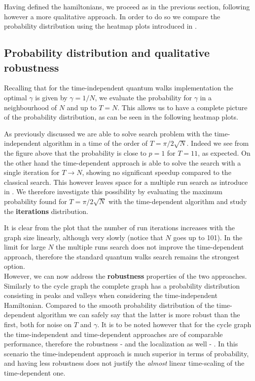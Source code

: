     \noindent
    Having defined the hamiltonians, we proceed as in the previous section, following however a more qualitative approach. In order to do so we compare the probability distribution using the heatmap plots introduced in .


    \subsection{Probability distribution and qualitative robustness}
    Recalling that for the time-independent quantum walks implementation the optimal $\gamma$ is given by $\gamma=1/N$, we evaluate the probability for $\gamma$ in a neighbourhood of $N$ and up to $T=N$. This allows us to have a complete picture of the probability distribution, as can be seen in the following heatmap plots.

    
    As previously discussed we are able to solve search problem with the time-independent algorithm in a time of the order of $T=\pi/2\sqrt{N}$. Indeed we see from the figure above that the probability is close to $p=1$ for $T=11$, as expected. On the other hand the time-dependent approach is able to solve the search with a single iteration for $T\rightarrow N$, showing no significant speedup compared to the classical search. This however leaves space for a multiple run search as introduce in . We therefore investigate this possibility by evaluating the maximum probability found for $T=\pi/2\sqrt{N}$ with the time-dependent algorithm and study the \textbf{iterations} distribution.

    

    It is clear from the plot that the number of run iterations increases with the graph size linearly, although very slowly (notice that $N$ goes up to 101). In the limit for large $N$ the multiple runs search does not improve the time-dependent approach, therefore the standard quantum walks search remains the strongest option.
    \\


    \noindent
    However, we can now address the \textbf{robustness} properties of the two approaches. Similarly to the cycle graph the complete graph has a probability distribution consisting in peaks and valleys when considering the time-independent Hamiltonian. Compared to the smooth probability distribution of the time-dependent algorithm we can safely say that the latter is more robust than the first, both for noise on $T$ and $\gamma$. It is to be noted however that for the cycle graph the time-independent and time-dependent approaches are of comparable performance, therefore the robustness - and the localization as well - . In this scenario the time-independent approach is much superior in terms of probability, and having less robustness does not justify the \textit{almost} linear time-scaling of the time-dependent one. \\


